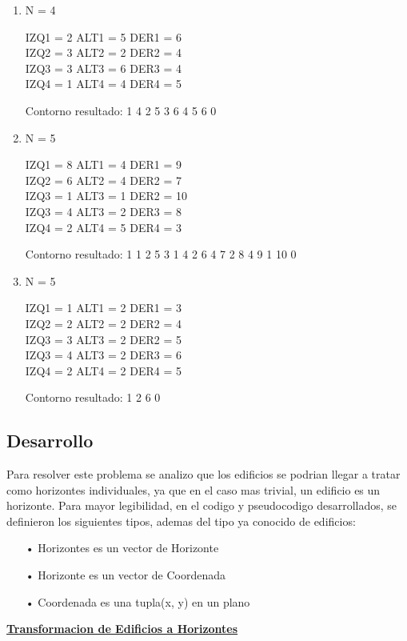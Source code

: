\documentclass[10pt,a4paper]{article}
\begin{document}
\begin{enumerate}[leftmargin=0.5cm]
\item N = 4

IZQ1 = 2 ALT1 = 5 DER1 = 6\\
IZQ2 = 3 ALT2 = 2 DER2 = 4\\
IZQ3 = 3 ALT3 = 6 DER3 = 4\\
IZQ4 = 1 ALT4 = 4 DER4 = 5

Contorno resultado: 1 4 2 5 3 6 4 5 6 0

\item N = 5

IZQ1 = 8 ALT1 = 4 DER1 = 9\\
IZQ2 = 6 ALT2 = 4 DER2 = 7\\
IZQ3 = 1 ALT3 = 1 DER2 = 10\\
IZQ3 = 4 ALT3 = 2 DER3 = 8\\
IZQ4 = 2 ALT4 = 5 DER4 = 3

Contorno resultado: 1 1 2 5 3 1 4 2 6 4 7 2 8 4 9 1 10 0

\item N = 5

IZQ1 = 1 ALT1 = 2 DER1 = 3\\
IZQ2 = 2 ALT2 = 2 DER2 = 4\\
IZQ3 = 3 ALT3 = 2 DER2 = 5\\
IZQ3 = 4 ALT3 = 2 DER3 = 6\\
IZQ4 = 2 ALT4 = 2 DER4 = 5

Contorno resultado: 1 2 6 0
\end{enumerate}
\newpage
\subsection{Desarrollo}
Para resolver este problema se analizo que los edificios se podrian llegar a tratar como horizontes individuales, ya que en el caso mas trivial, un edificio es un horizonte. Para mayor legibilidad, en el codigo y pseudocodigo desarrollados, se definieron los siguientes tipos, ademas del tipo ya conocido de edificios:

\begin{itemize}
\item[•]Horizontes es un vector de Horizonte
\item[•]Horizonte es un vector de Coordenada
\item[•]Coordenada es una tupla(x, y) en un plano
\end{itemize}
\bigskip
\noindent \underline{\textbf{Transformacion de Edificios a Horizontes}}
\end{document}

